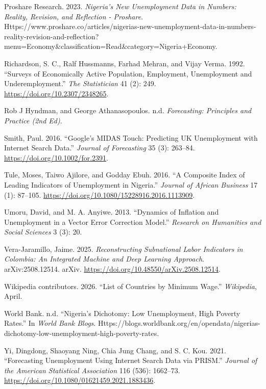 \documentclass[
  letterpaper,
  DIV=11,
  numbers=noendperiod]{scrartcl}
\newlength{\cslhangindent}
\newenvironment{CSLReferences}[2] %
 {\begin{list}{}{%
  \setlength{\itemindent}{0pt}
  \setlength{\leftmargin}{0pt}
  \setlength{\parsep}{0pt}
  \ifodd #1
   \setlength{\leftmargin}{\cslhangindent}
   \setlength{\itemindent}{-1\cslhangindent}
  \fi
  \setlength{\itemsep}{#2\baselineskip}}}
 {\end{list}}
\begin{document}
\begin{CSLReferences}{1}{1}
Proshare Research. 2023. \emph{Nigeria's {New Unemployment Data} in
{Numbers}: {Reality}, {Revision}, and {Reflection} - {Proshare}}.
Https://www.proshare.co/articles/nigerias-new-unemployment-data-in-numbers-reality-revision-and-reflection?menu=Economy\&classification=Read\&category=Nigeria+Economy.

Richardson, S. C., Ralf Hussmanns, Farhad Mehran, and Vijay Verma. 1992.
{``Surveys of {Economically Active Population}, {Employment},
{Unemployment} and {Underemployment}.''} \emph{The Statistician} 41 (2):
249. \url{https://doi.org/10.2307/2348265}.

Rob J Hyndman, and George Athanasopoulos. n.d. \emph{Forecasting:
{Principles} and {Practice} (2nd Ed)}.

Smith, Paul. 2016. {``Google's {MIDAS Touch}: {Predicting UK
Unemployment} with {Internet Search Data}.''} \emph{Journal of
Forecasting} 35 (3): 263--84. \url{https://doi.org/10.1002/for.2391}.

Tule, Moses, Taiwo Ajilore, and Godday Ebuh. 2016. {``A Composite Index
of Leading Indicators of Unemployment in {Nigeria}.''} \emph{Journal of
African Business} 17 (1): 87--105.
\url{https://doi.org/10.1080/15228916.2016.1113909}.

Umoru, David, and M. A. Anyiwe. 2013. {``Dynamics of {Inflation} and
{Unemployment} in a {Vector Error Correction Model}.''} \emph{Research
on Humanities and Social Sciences} 3 (3): 20.

Vera-Jaramillo, Jaime. 2025. \emph{Reconstructing {Subnational Labor
Indicators} in {Colombia}: {An Integrated Machine} and {Deep Learning
Approach}}. arXiv:2508.12514. arXiv.
\url{https://doi.org/10.48550/arXiv.2508.12514}.

Wikipedia contributors. 2026. {``List of Countries by Minimum Wage.''}
\emph{Wikipedia}, April.

World Bank. n.d. {``Nigeria's Dichotomy: Low Unemployment, High Poverty
Rates.''} In \emph{World Bank Blogs}.
Https://blogs.worldbank.org/en/opendata/nigerias-dichotomy-low-unemployment-high-poverty-rates.

Yi, Dingdong, Shaoyang Ning, Chia Jung Chang, and S. C. Kou. 2021.
{``Forecasting {Unemployment Using Internet Search Data} via {PRISM}.''}
\emph{Journal of the American Statistical Association} 116 (536):
1662--73. \url{https://doi.org/10.1080/01621459.2021.1883436}.

\end{CSLReferences}
\end{document}
